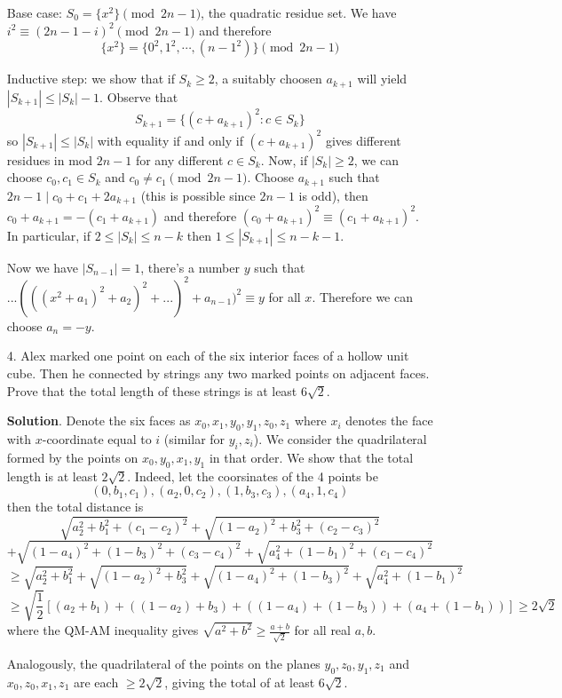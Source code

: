 \documentclass[11pt,a4paper]{article}
\begin{document}
\begin{enumerate}
	Base case: $S_0=\{x^2\}\pmod{2n-1}$, the quadratic residue set. We have $i^2\equiv (2n-1-i)^2\pmod{2n-1}$ and therefore 
	\[
	\{x^2\}=\{0^2, 1^2, \cdots , (n-1^2)\}\pmod{2n-1}
	\]
	
	Inductive step: we show that if $S_k\ge 2$, a suitably choosen $a_{k+1}$ will yield $|S_{k+1}|\le |S_k|-1$. Observe that 
	\[
	S_{k+1} = \{(c+a_{k+1})^2: c\in S_k\}
	\]
	so $|S_{k+1}|\le |S_k|$ with equality if and only if $(c+a_{k+1})^2$ gives different residues in mod $2n-1$ for any different $c\in S_k$. Now, if $|S_k|\ge 2$, we can choose $c_0, c_1\in S_k$ and $c_0\neq c_1\pmod{2n-1}$. Choose $a_{k+1}$ such that $2n-1\mid c_0+c_1+2a_{k+1}$ (this is possible since $2n-1$ is odd), then $c_0+a_{k+1}=-(c_1+a_{k+1})$ and therefore $(c_0+a_{k+1})^2\equiv (c_1+a_{k+1})^2$. In particular, if $2\le |S_k|\le n-k$ then $1\le |S_{k+1}|\le n-k-1$. 
	
	Now we have $|S_{n-1}|=1$, there's a number $y$ such that $... (((x^2 + a_1)^2 + a_2)^2 + ...)^2 + a_{n-1})^2\equiv y$ for all $x$. Therefore we can choose $a_n=-y$. 
	
	\item[4.] Alex marked one point on each of the six interior faces of a hollow unit cube. Then he connected by strings any two marked points on adjacent faces. Prove that the total length of
	these strings is at least $6\sqrt{2}$. 
	
	\textbf{Solution}. Denote the six faces as $x_0, x_1, y_0, y_1, z_0, z_1$ where $x_i$ denotes the face with $x$-coordinate equal to $i$ (similar for $y_i, z_i$). We consider the quadrilateral formed by the points on $x_0, y_0, x_1, y_1$ in that order. We show that the total length is at least $2\sqrt{2}$. 
	Indeed, let the coorsinates of the 4 points be 
	\[
	(0, b_1, c_1), (a_2, 0, c_2), (1, b_3, c_3), (a_4, 1, c_4)
	\]
	then the total distance is 
	\[
	\sqrt{a_2^2+b_1^2+(c_1-c_2)^2}
	+\sqrt{(1-a_2)^2 + b_3^2 + (c_2-c_3)^2}
	\]\[
	+\sqrt{(1-a_4)^2+(1-b_3)^2+(c_3-c_4)^2}
	+\sqrt{a_4^2+(1-b_1)^2+(c_1-c_4)^2}
	\]
	\[
	\ge 
	\sqrt{a_2^2+b_1^2}
	+\sqrt{(1-a_2)^2 + b_3^2}
	+\sqrt{(1-a_4)^2+(1-b_3)^2}
	+\sqrt{a_4^2+(1-b_1)^2}
	\]
	\[
	\ge \sqrt{\frac 12}
	[
	(a_2+b_1)
	+((1-a_2)+b_3)
	+((1-a_4)+(1-b_3))
	+(a_4+(1-b_1))]
	\ge 2\sqrt{2}
	\]
	where the QM-AM inequality gives $\sqrt{a^2+b^2}\ge \frac{a+b}{\sqrt{2}}$ for all real $a, b$. 
	
	Analogously, the quadrilateral of the points on the planes $y_0, z_0, y_1, z_1$ and $x_0, z_0, x_1, z_1$ are each $\ge 2\sqrt{2}$, giving the total of at least $6\sqrt{2}$. 
	

\end{enumerate}
\end{document}
